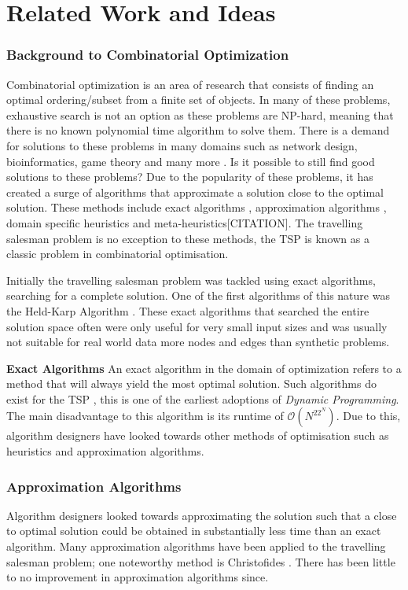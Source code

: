 \documentclass[]{UCD_CS_FYP_Report}
\begin{document}
\chapter{Related Work and Ideas}
\subsection{Background to Combinatorial Optimization}
Combinatorial optimization is an area of research that consists of finding an optimal ordering/subset from a finite set of objects. In many of these problems, exhaustive search is not an option as these problems are NP-hard, meaning that there is no known polynomial time algorithm to solve them. There is a demand for solutions to these problems in many domains such as network design, bioinformatics, game theory and many more \cite{combApplications}. Is it possible to still find good solutions to these problems? Due to the popularity of these problems, it has created a surge of algorithms that approximate a solution close to the optimal solution. These methods include exact algorithms \cite{Bellman:1962:DPT:321105.321111}, approximation algorithms \cite{JohnMcGe97}, domain specific heuristics\cite{davidapplegate2007} and meta-heuristics[CITATION]. The travelling salesman problem is no exception to these methods, the TSP is known as a classic problem in combinatorial optimisation. 

Initially the travelling salesman problem was tackled using exact algorithms, searching for a complete solution. One of the first algorithms of this nature was the Held-Karp Algorithm \cite{Bellman:1962:DPT:321105.321111}. These exact algorithms that searched the entire solution space often were only useful for very small input sizes and was usually not suitable for real world data more nodes and edges than synthetic problems.

\textbf{Exact Algorithms}
An exact algorithm in the domain of optimization refers to a method that will always yield the most optimal solution. Such algorithms do exist for the TSP \cite{Bellman:1962:DPT:321105.321111}, this is one of the earliest adoptions of \textit{Dynamic Programming}. The main disadvantage to this algorithm is its runtime of $\mathcal{O}(N^22^N)$. Due to this, algorithm designers have looked towards other methods of optimisation such as heuristics and approximation algorithms.

\subsection{Approximation Algorithms}
Algorithm designers looked towards approximating the solution such that a close to optimal solution could be obtained in substantially less time than an exact algorithm. Many approximation algorithms have been applied to the travelling salesman problem; one noteworthy method is Christofides \cite{JohnMcGe97}. There has been little to no improvement in approximation algorithms since. 
\end{document}
